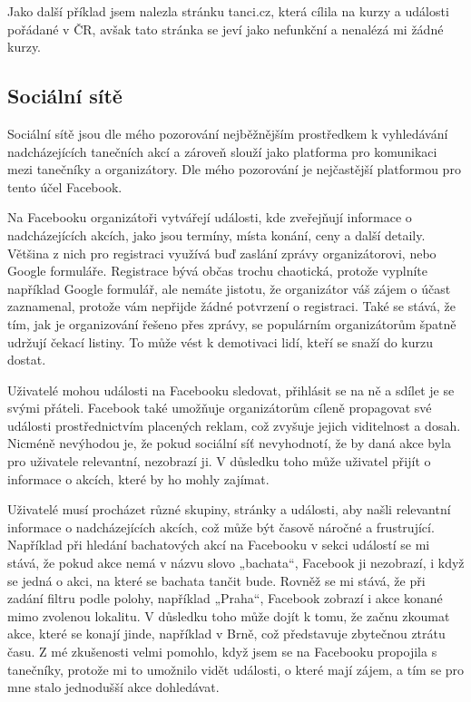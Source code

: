 Jako další příklad jsem nalezla stránku tanci.cz, která cílila na kurzy a události pořádané v ČR, avšak tato stránka se jeví jako nefunkční a nenalézá mi žádné kurzy.

\subsection{Sociální sítě}
Sociální sítě jsou dle mého pozorování nejběžnějším prostředkem k vyhledávání nadcházejících tanečních akcí a zároveň slouží jako platforma pro komunikaci mezi tanečníky a organizátory. Dle mého pozorování je nejčastější platformou pro tento účel Facebook.

Na Facebooku organizátoři vytvářejí události, kde zveřejňují informace o nadcházejících akcích, jako jsou termíny, místa konání, ceny a další detaily. Většina z nich pro registraci využívá buď zaslání zprávy organizátorovi, nebo Google formuláře. Registrace bývá občas trochu chaotická, protože vyplníte například Google formulář, ale nemáte jistotu, že organizátor váš zájem o účast zaznamenal, protože vám nepřijde žádné potvrzení o registraci. Také se stává, že tím, jak je organizování řešeno přes zprávy, se populárním organizátorům špatně udržují čekací listiny. To může vést k demotivaci lidí, kteří se snaží do kurzu dostat.

Uživatelé mohou události na Facebooku sledovat, přihlásit se na ně a sdílet je se svými přáteli. Facebook také umožňuje organizátorům cíleně propagovat své události prostřednictvím placených reklam, což zvyšuje jejich viditelnost a dosah. Nicméně nevýhodou je, že pokud sociální síť nevyhodnotí, že by daná akce byla pro uživatele relevantní, nezobrazí ji. V důsledku toho může uživatel přijít o informace o akcích, které by ho mohly zajímat.

Uživatelé musí procházet různé skupiny, stránky a události, aby našli relevantní informace o nadcházejících akcích, což může být časově náročné a frustrující. Například při hledání bachatových akcí na Facebooku v sekci událostí se mi stává, že pokud akce nemá v názvu slovo „bachata“, Facebook ji nezobrazí, i když se jedná o akci, na které se bachata tančit bude. Rovněž se mi stává, že při zadání filtru podle polohy, například „Praha“, Facebook zobrazí i akce konané mimo zvolenou lokalitu. V důsledku toho může dojít k tomu, že začnu zkoumat akce, které se konají jinde, například v Brně, což představuje zbytečnou ztrátu času.
Z mé zkušenosti velmi pomohlo, když jsem se na Facebooku propojila s tanečníky, protože mi to umožnilo vidět události, o které mají zájem, a tím se pro mne stalo jednodušší akce dohledávat.

